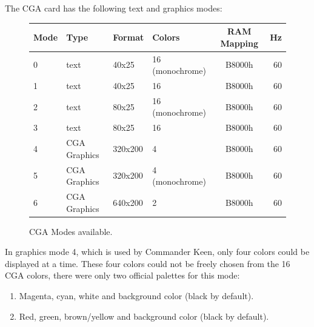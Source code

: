 \documentclass[book.tex]{subfiles}
\begin{document}
The CGA card has the following text and graphics modes:\\
\vspace{-15pt}
\begin{figure}[H]
\centering
\begin{table}[H]
\begin{tabularx}{\textwidth}[c]{llllcr}
\hline
\textbf{Mode} & \textbf{Type} & \textbf{Format} & \textbf{Colors} & \hspace{10pt}\textbf{RAM Mapping}\hspace{10pt} & \textbf{Hz}        \\ \hline
0             & text          & 40x25           & 16 (monochrome) & B8000h     & 60                           \\ \hline
1             & text          & 40x25           & 16              & B8000h    & 60                            \\ \hline
2             & text          & 80x25           & 16 (monochrome) & B8000h    & 60                            \\ \hline
3             & text          & 80x25           & 16              & B8000h    & 60                            \\ \hline
4             & CGA Graphics  & 320x200         & 4               & B8000h    & 60                            \\ \hline
5             & CGA Graphics  & 320x200         & 4 (monochrome)  & B8000h    & 60                            \\ \hline
6             & CGA Graphics  & 640x200         & 2               & B8000h    & 60                            \\ \hline

\end{tabularx}
\end{table}
\caption{CGA Modes available.}
\label{ega-modes-available}
 \end{figure} 

In graphics mode 4, which is used by Commander Keen, only four colors could be displayed at a time. These four colors could not be freely chosen from the 16 CGA colors, there were only two official palettes for this mode:
\begin{enumerate}
  \item Magenta, cyan, white and background color (black by default).
  \item Red, green, brown/yellow and background color (black by default).
\end{enumerate}
\end{document}

